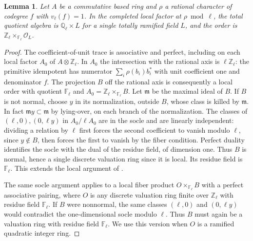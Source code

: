 \documentclass[11pt,a4paper]{article}
\newtheorem{lemma}[theorem]{Lemma}
\numberwithin{equation}{section}
\begin{document}
\begin{lemma}\label{lem:r5-local-partner}
Let $A$ be a commutative based ring and $\rho$ a rational character of
codegree $f$ with $v_\ell(f)=1$. In the completed local factor at
$\rho\bmod\ell$, the total quotient algebra is
$\mathbb Q_\ell\times L$ for a single totally ramified field $L$, and
the order is $\mathbb Z_\ell\times_{\mathbb F_\ell}\mathcal O_L$.
\end{lemma}
\begin{proof}
The coefficient-of-unit trace is associative and perfect, including
on each local factor $A_0$ of $A\otimes\mathbb Z_\ell$. In $A_0$ the
intersection with the rational axis is $\ell\mathbb Z_\ell$: the
primitive idempotent has numerator $\sum_i\rho(b_i)b_i^*$ with unit
coefficient one and denominator $f$. The projection $B$ off the
rational axis is consequently a local order with quotient
$\mathbb F_\ell$ and $A_0=\mathbb Z_\ell\times_{\mathbb F_\ell} B$.
Let $\mathfrak m$ be the maximal ideal of $B$. If $B$ is not normal,
choose $y$ in its normalization, outside $B$, whose class is killed by
$\mathfrak m$. In fact $\mathfrak m y\subset\mathfrak m$ by
lying-over, on each branch of the normalization. The classes of
$(\ell,0),(0,\ell y)$ in $A_0/\ell A_0$ are in the socle and are
linearly independent: dividing a relation by $\ell$ first forces the
second coefficient to vanish modulo $\ell$, since $y\notin B$, then
forces the first to vanish by the fiber condition. Perfect duality
identifies the socle with the dual of the residue field, of dimension
one. Thus $B$ is normal, hence a single discrete valuation ring since
it is local. Its residue field is $\mathbb F_\ell$. This extends the
local argument of \cite[Lemma~8.5]{Rank4}.

The same socle argument applies to a local fiber product
$O\times_{\mathbb F_\ell}B$ with a perfect associative pairing,
where $O$ is any discrete valuation ring finite over $\mathbb Z_\ell$
with residue field $\mathbb F_\ell$. If $B$ were nonnormal, the
same classes $(\ell,0)$ and $(0,\ell y)$ would contradict the
one-dimensional socle modulo $\ell$. Thus $B$ must again be a
valuation ring with residue field $\mathbb F_\ell$. We use this
version when $O$ is a ramified quadratic integer ring.
\end{proof}
\end{document}
